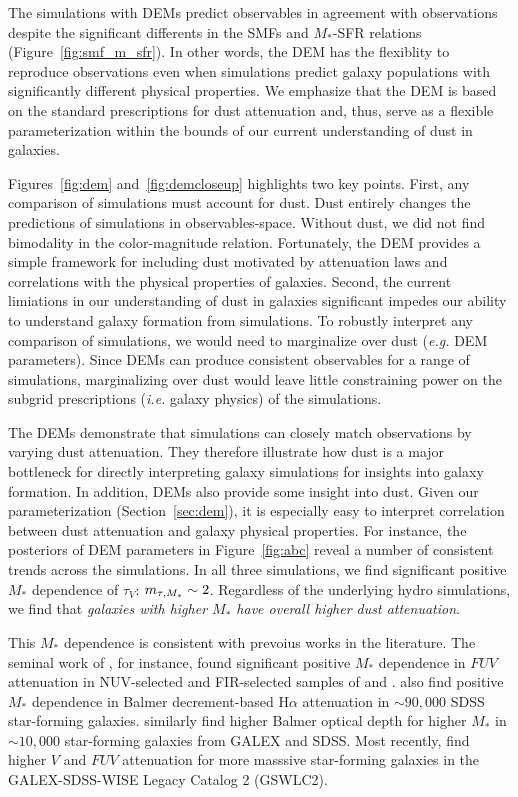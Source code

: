 The simulations with DEMs predict observables in agreement with observations 
despite the significant differents in the SMFs and $M_*$-SFR relations 
(Figure~\ref{fig:smf_m_sfr}). In other words, the DEM has the 
flexiblity to reproduce observations even when simulations predict galaxy
populations with significantly different physical properties. We emphasize that
the DEM is based on the standard prescriptions for dust attenuation and, thus,
serve as a flexible parameterization within the bounds of our current
understanding of dust in galaxies.

Figures~\ref{fig:dem} and~\ref{fig:demcloseup} highlights two key points. First, any comparison of
simulations must account for dust. Dust entirely changes the predictions of
simulations in observables-space. Without dust, we did not find bimodality in
the color-magnitude relation.
Fortunately, the DEM provides a simple framework
for including dust motivated by attenuation laws and correlations with the
physical properties of galaxies. 
Second, the current limiations in our understanding of dust in galaxies 
significant impedes our ability to understand galaxy formation from simulations. 
To robustly interpret any comparison of simulations, we would need to
marginalize over dust (\emph{e.g.} DEM parameters). Since DEMs can produce
consistent observables for a range of simulations, marginalizing over dust
would leave little constraining power on the subgrid prescriptions (\emph{i.e.}
galaxy physics) of the simulations. 

The DEMs demonstrate that simulations can closely match observations by varying
dust attenuation. They therefore illustrate how dust is a major bottleneck for
directly interpreting galaxy simulations for insights into galaxy formation. In
addition, DEMs also provide some insight into dust. Given our parameterization
(Section~\ref{sec:dem}), it is especially easy to interpret correlation between
dust attenuation and galaxy physical properties. For instance, the posteriors of
DEM parameters in Figure~\ref{fig:abc} reveal a
number of consistent trends across the simulations. In all three simulations, we find significant positive
$M_*$ dependence of $\tau_V$: $m_{\tau,M_*} \sim 2$. Regardless of the underlying
hydro simulations, we find that {\em galaxies with higher $M_*$ have overall higher 
dust attenuation}.

This $M_*$ dependence is consistent with prevoius works in the literature.
The seminal work of \cite{burgarella2005}, for instance, found significant
positive $M_*$ dependence in $FUV$ attenuation in NUV-selected and FIR-selected
samples of \cite{buat2005} and \cite{iglesias-paramo2006}. \cite{garn2010} also
find positive $M_*$ dependence in Balmer decrement-based H$\alpha$ attenuation
in ${\sim}90,000$ SDSS star-forming galaxies. \cite{battisti2016} similarly
find higher Balmer optical depth for higher $M_*$ in ${\sim}10,000$
star-forming galaxies from GALEX and SDSS. Most recently, \cite{salim2018} 
find higher $V$ and $FUV$ attenuation for more masssive star-forming galaxies in the
GALEX-SDSS-WISE Legacy Catalog 2 (GSWLC2). 

